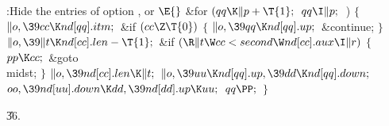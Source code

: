 \Y\B\4:Hide the entries of option , or %
\X${}\E{}$\6
\&{for} ${}(\\{qq}\K\|p+\T{1};{}$ ${}\\{qq}\I\|p;{}$ \,)\5
${}\{{}$\1\6
${}\|o,\39\\{cc}\K\\{nd}[\\{qq}].\\{itm};{}$\6
\&{if} ${}(\\{cc}\Z\T{0}){}$\5
${}\{{}$\1\6
${}\|o,\39\\{qq}\K\\{nd}[\\{qq}].\\{up};{}$\6
\&{continue};\6
\4${}\}{}$\2\6
${}\|o,\39\|t\K\\{nd}[\\{cc}].\\{len}-\T{1};{}$\6
\&{if} ${}(\R\|t\W\\{cc}<\\{second}\W\\{nd}[\\{cc}].\\{aux}\I\|r){}$\5
${}\{{}$\1\6
${}\\{pp}\K\\{cc};{}$\6
\&{goto} \\{midst};\6
\4${}\}{}$\2\6
${}\|o,\39\\{nd}[\\{cc}].\\{len}\K\|t;{}$\6
${}\|o,\39\\{uu}\K\\{nd}[\\{qq}].\\{up},\39\\{dd}\K\\{nd}[\\{qq}].\\{down};{}$\6
${}\\{oo},\39\\{nd}[\\{uu}].\\{down}\K\\{dd},\39\\{nd}[\\{dd}].\\{up}\K%
\\{uu};{}$\6
${}\\{qq}\PP;{}$\6
\4${}\}{}$\2\par
\U36.\fi

